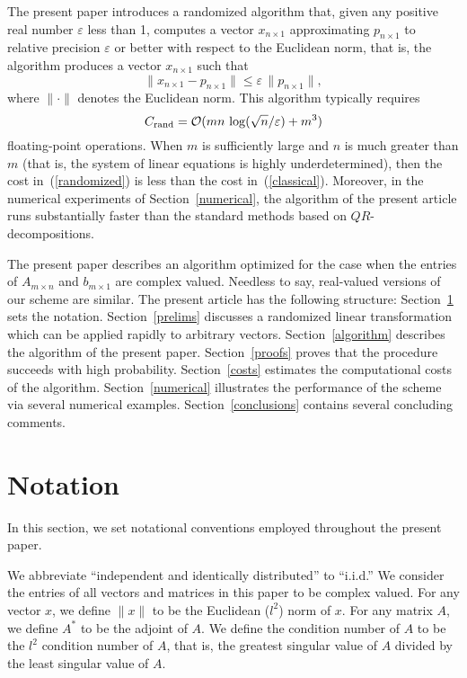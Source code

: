 \documentclass[letterpaper,12pt]{article}
\def\epsilon{\varepsilon}
\def\bigoh{\mathcal{O}}
\begin{document}
The present paper introduces a randomized algorithm that,
given any positive real number $\epsilon$ less than 1,
computes a vector $x_{n \times 1}$ approximating $p_{n \times 1}$
to relative precision $\epsilon$ or better
with respect to the Euclidean norm, that is,
the algorithm produces a vector $x_{n \times 1}$ such that
\begin{equation}
\| x_{n \times 1} - p_{n \times 1} \| \le \epsilon \, \| p_{n \times 1} \|,
\end{equation}
where $\| \cdot \|$ denotes the Euclidean norm.
This algorithm typically requires
\begin{equation}
\label{randomized}
C_{\rm rand} = \bigoh(mn \, \log(\sqrt{n}/\epsilon) + m^3)
\end{equation}
floating-point operations.
When $m$ is sufficiently large and $n$ is much greater than $m$
(that is, the system of linear equations is highly underdetermined),
then the cost in~(\ref{randomized}) is less than
the cost in~(\ref{classical}).
Moreover, in the numerical experiments of Section~\ref{numerical},
the algorithm of the present article runs substantially faster than
the standard methods based on $QR$-decompositions.

The present paper describes an algorithm optimized for the case
when the entries of $A_{m \times n}$ and $b_{m \times 1}$ are complex valued.
Needless to say, real-valued versions of our scheme are similar.
The present article has the following structure:
Section~\ref{notation} sets the notation.
Section~\ref{prelims} discusses a randomized linear transformation
which can be applied rapidly to arbitrary vectors.
Section~\ref{algorithm} describes the algorithm of the present paper.
Section~\ref{proofs} proves that the procedure succeeds with high probability.
Section~\ref{costs} estimates the computational costs of the algorithm.
Section~\ref{numerical} illustrates the performance of the scheme
via several numerical examples.
Section~\ref{conclusions} contains several concluding comments.



\section{Notation}
\label{notation}


In this section, we set notational conventions employed
throughout the present paper.

We abbreviate ``independent and identically distributed'' to ``i.i.d.''
We consider the entries of all vectors and matrices in this paper
to be complex valued.
For any vector $x$, we define $\|x\|$ to be the Euclidean ($l^2$) norm of $x$.
For any matrix $A$, we define $A^*$ to be the adjoint of $A$.
We define the condition number of $A$ to be the $l^2$ condition number of $A$,
that is, the greatest singular value of $A$ divided
by the least singular value of $A$.
\end{document}
